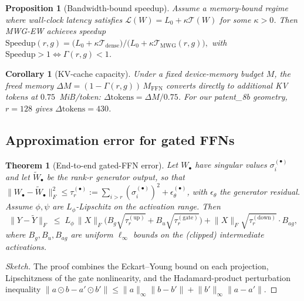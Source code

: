 \documentclass[11pt]{article}
\newtheorem{theorem}{Theorem}
\newtheorem{proposition}{Proposition}
\newtheorem{corollary}{Corollary}
\theoremstyle{definition}
\newcommand{\norm}[1]{\lVert #1 \rVert}
\newcommand{\trafficop}{\mathcal{T}}
\newcommand{\Loss}{\mathcal{L}}
\begin{document}
\begin{proposition}[Bandwidth-bound speedup]\label{prop:speedup}
Assume a memory-bound regime where wall-clock latency satisfies $\Loss(W)=L_0+\kappa\trafficop(W)$ for some $\kappa>0$. Then MWG-EW achieves speedup
\(
\mathrm{Speedup}(r,g) = \big(L_0+\kappa\trafficop_{\mathrm{dense}}\big)\big/\big(L_0+\kappa\trafficop_{\mathrm{MWG}}(r,g)\big),
\)
with $\mathrm{Speedup}>1 \Longleftrightarrow \Gamma(r,g)<1$.
\end{proposition}

\begin{corollary}[KV-cache capacity]\label{cor:kv}
Under a fixed device-memory budget $M$, the freed memory $\Delta M = (1-\Gamma(r,g))\,M_{\text{FFN}}$ converts directly to additional KV tokens at $0.75$~MiB/token: $\Delta\text{tokens} = \Delta M / 0.75$. For our patent\_8b geometry, $r{=}128$ gives $\Delta\text{tokens}=430$.
\end{corollary}

\subsection{Approximation error for gated FFNs}

\begin{theorem}[End-to-end gated-FFN error]\label{thm:gated_ffn}
Let $W_\bullet$ have singular values $\sigma_i^{(\bullet)}$ and let $\widetilde W_\bullet$ be the rank-$r$ generator output, so that $\norm{W_\bullet-\widetilde W_\bullet}_F^2 \le \tau_r^{(\bullet)} := \sum_{i>r}(\sigma_i^{(\bullet)})^2 + \epsilon_\theta^{(\bullet)}$, with $\epsilon_\theta$ the generator residual. Assume $\phi,\psi$ are $L_\phi$-Lipschitz on the activation range. Then
\begin{equation}
\norm{Y - \widetilde Y}_F \;\le\; L_\phi\,\norm{X}_F\big(B_g\sqrt{\tau_r^{(\text{up})}} + B_u\sqrt{\tau_r^{(\text{gate})}}\big) + \norm{X}_F\sqrt{\tau_r^{(\text{down})}}\cdot B_{ag},
\end{equation}
where $B_g,B_u,B_{ag}$ are uniform $\ell_\infty$ bounds on the (clipped) intermediate activations.
\end{theorem}

\begin{proof}[Sketch]
The proof combines the Eckart--Young bound on each projection, Lipschitzness of the gate nonlinearity, and the Hadamard-product perturbation inequality $\norm{a\odot b - a'\odot b'}\le\norm{a}_\infty\norm{b-b'}+\norm{b'}_\infty\norm{a-a'}$.
\end{proof}
\end{document}
